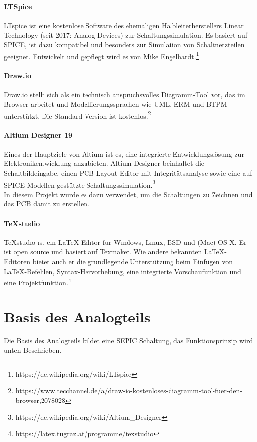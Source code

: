 \documentclass[paper=a4, 12pt]{scrreprt}
\begin{document}
	\paragraph{LTSpice}\hfill \break
	LTspice ist eine kostenlose Software des ehemaligen Halbleiterherstellers Linear Technology (seit 2017: Analog Devices) zur Schaltungssimulation. Es basiert auf SPICE, ist dazu kompatibel und besonders zur Simulation von Schaltnetzteilen geeignet. Entwickelt und gepflegt wird es von Mike Engelhardt.\footnote{https://de.wikipedia.org/wiki/LTspice}
	\paragraph{Draw.io}\hfill \break
	Draw.io stellt sich als ein technisch anspruchsvolles Diagramm-Tool vor, das im Browser arbeitet und Modellierungssprachen wie UML, ERM und BTPM unterstützt. Die Standard-Version ist kostenlos.\footnote{https://www.tecchannel.de/a/draw-io-kostenloses-diagramm-tool-fuer-den-browser,2078028}
	\paragraph{Altium Designer 19}\hfill \break
	Eines der Hauptziele von Altium ist es, eine integrierte Entwicklungslösung zur Elektronikentwicklung anzubieten.
	Altium Designer beinhaltet die Schaltbildeingabe, einen PCB Layout Editor mit Integritätsanalyse sowie eine auf SPICE-Modellen gestützte Schaltungssimulation.\footnote{https://de.wikipedia.org/wiki/Altium\_Designer}\\
	In diesem Projekt wurde es dazu verwendet, um die Schaltungen zu Zeichnen und das PCB damit zu erstellen.
	\paragraph{TeXstudio}\hfill \break
	TeXstudio ist ein LaTeX-Editor für Windows, Linux, BSD und (Mac) OS X. Er ist open source und basiert auf Texmaker. Wie andere bekannten LaTeX-Editoren bietet auch er die grundlegende Unterstützung beim Einfügen von LaTeX-Befehlen, Syntax-Hervorhebung, eine integrierte Vorschaufunktion und eine Projektfunktion.\footnote{https://latex.tugraz.at/programme/texstudio}
	\newpage
	
	\section{Basis des Analogteils}
	Die Basis des Analogteils bildet eine SEPIC Schaltung, das Funktionsprinzip wird unten Beschrieben.
\end{document}
